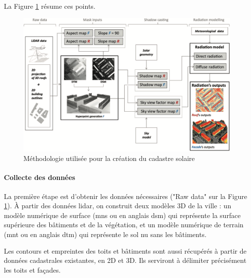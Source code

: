 \par{La Figure \ref{fig:cadastre_solaire_methodologie} résume ces points.}
\begin{figure}[H]
    \centering
    \includegraphics[width=1\linewidth]{02-main//figures/ch2/cadastre_solaire_methodologie.png}
    \caption{Méthodologie utilisée pour la création du cadastre solaire \cite{desthieux_solar_2018}}
    \label{fig:cadastre_solaire_methodologie}
\end{figure}

\paragraph{Collecte des données}
\par{La première étape est d'obtenir les données nécessaires ("Raw data" sur la Figure \ref{fig:cadastre_solaire_methodologie}). À partir des données \gls{lidar}, on construit deux modèles 3D de la ville : un modèle numérique de surface (\acrshort{mns} ou en anglais \acrshort{dsm}) qui représente la surface supérieure des bâtiments et de la végétation, et un modèle numérique de terrain (\acrshort{mnt} ou en anglais \acrshort{dtm}) qui représente le sol nu sans les bâtiments.}
\par{Les contours et empreintes des toits et bâtiments  sont aussi récupérés à partir de données cadastrales existantes, en 2D et 3D. Ils serviront à délimiter précisément les toits et façades.}

